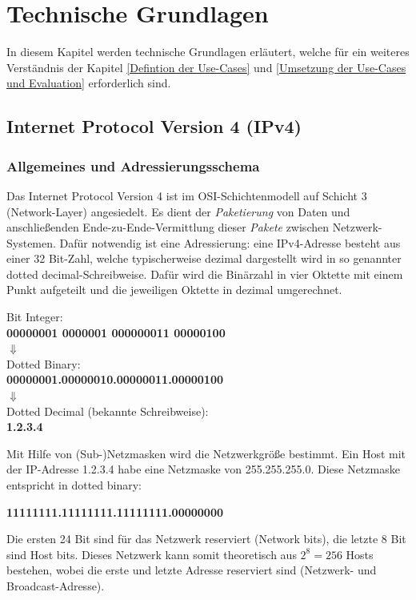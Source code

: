 \chapter{Technische Grundlagen} \label{Technische_Grundlagen}

In diesem Kapitel werden technische Grundlagen erläutert, welche für ein weiteres Verständnis der Kapitel \ref{Defintion der Use-Cases} und \ref{Umsetzung der Use-Cases und Evaluation} erforderlich sind.
\section{Internet Protocol Version 4 (IPv4)} \label{ipv4}

\subsection{Allgemeines und Adressierungsschema}
Das Internet Protocol Version 4 ist im \gls{OSI-Schichtenmodell} auf Schicht 3 (Network-Layer) angesiedelt\cite{itu1994}. Es dient der \textit{Paketierung} von Daten und anschließenden Ende-zu-Ende-Vermittlung dieser \textit{Pakete} zwischen Netzwerk-Systemen. Dafür notwendig ist eine Adressierung: eine IPv4-Adresse besteht aus einer 32 Bit-Zahl, welche typischerweise dezimal dargestellt wird in so genannter \glqq dotted decimal\grqq{}-Schreibweise. Dafür wird die Binärzahl in vier Oktette mit einem Punkt aufgeteilt und die jeweiligen Oktette in dezimal umgerechnet.

{ Bit Integer:\\
\textbf{00000001 0000001 000000011 00000100}\\
$\Downarrow$\\
\glqq Dotted Binary\grqq{}:\\
\textbf{00000001.00000010.00000011.00000100}\\
$\Downarrow$\\
Dotted Decimal (bekannte Schreibweise):\\
{\textbf{1.2.3.4}}\par}

Mit Hilfe von (Sub-)Netzmasken wird die Netzwerkgröße bestimmt. Ein Host mit der IP-Adresse 1.2.3.4 habe eine Netzmaske von 255.255.255.0. Diese Netzmaske entspricht in dotted binary:

{\centering\textbf{11111111.11111111.11111111.00000000}\par}

Die ersten 24 Bit sind für das Netzwerk reserviert (Network bits), die letzte 8 Bit sind Host bits. Dieses Netzwerk kann somit theoretisch aus $2^8 = 256$ Hosts bestehen, wobei die erste und letzte Adresse reserviert sind (Netzwerk- und Broadcast-Adresse).

